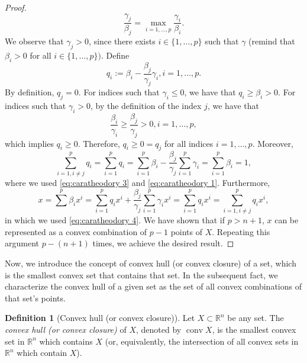 \documentclass[smallextended,numbook,nospthms]{svjour3}
\theoremstyle{plain}
\theoremstyle{definition}
\newtheorem{definition}[theorem]{Definition}
\def\RR{\mathds R}
\begin{document}
\begin{proof}
	\[
	\frac{\gamma_{j}}{\beta_{j}}=\max _{i=1, \ldots, p} \frac{\gamma_{i}}{\beta_{i}}.
	\]
	We observe that $\gamma_{j}>0$, since there exists $i \in\{1, \ldots, p\}$ such that $\gamma$ (remind that $\beta_{i}>0$ for all $i \in\{1, \ldots, p\})$. Define
	\[
	q_{i}:=\beta_{i}-\frac{\beta_{j}}{\gamma_{j}} \gamma_{i}, i=1, \ldots, p.
	\]
	By definition, $q_{j}=0$. For indices such that $\gamma_{i} \leq 0$, we have that $q_{i} \geq \beta_{i}>0$. For indices such that $\gamma_{i}>0$, by the definition of the index $j$, we have that
	\[
	\frac{\beta_{i}}{\gamma_{i}} \geq \frac{\beta_{j}}{\gamma_{j}}>0, i=1, \ldots, p,
	\]
	which implies $q_{i} \geq 0$. Therefore, $q_{i} \geq 0=q_{j}$ for all indices $i=1, \ldots, p$. Moreover,
	\[
	\sum_{i=1, i \neq j}^{p} q_{i}=\sum_{i=1}^{p} q_{i}=\sum_{i=1}^{p} \beta_{i}-\frac{\beta_{j}}{\gamma_{j}} \sum_{i=1}^{p} \gamma_{i}=\sum_{i=1}^{p} \beta_{i}=1,
	\]
	where we used \cref{eq:caratheodory 3} and \cref{eq:caratheodory 1}. Furthermore,
	\[
	x=\sum^{p} \beta_{i} x^{i}=\sum_{i=1}^{p} q_{i} x^{i}+\frac{\beta_{j}}{\gamma_{j}} \sum_{i=1}^{p} \gamma_{i} x^{i}=\sum_{i=1}^{p} q_{i} x^{i}=\sum_{i=1, i \neq j}^{p} q_{i} x^{i},
	\]
	in which we used \cref{eq:caratheodory 4}. We have shown that if $p> n+1$, $x$ can be represented as a convex combination of $p-1$ points of $X$. Repeating this argument $p-(n+1)$ times, we achieve the desired result.
\end{proof}

Now, we introduce the concept of convex hull (or convex closure) of a set, which is the smallest convex set that contains that set. In the subsequent fact, we characterize the convex hull of a given set as the set of all convex combinations of that set's points.
\begin{definition}[Convex hull (or convex closure)]\label{fact:conv hull}
	Let $X \subset \RR^n$ be any set. The \emph{convex hull (or convex closure)} of $X$, denoted by $\operatorname{conv} X$, is the smallest convex set in $\RR^n$ which contains $X$ (or, equivalently, the intersection of all convex sets in $\RR^n$ which contain $X$).
\end{definition}
\end{document}
